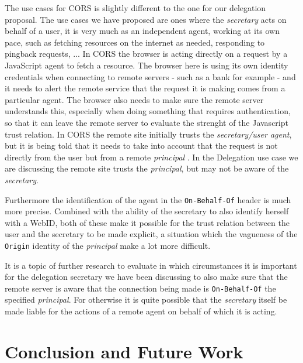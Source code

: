 \documentclass[a4paper]{llncs}
\begin{document}
The use cases for CORS is slightly different to the one for our delegation proposal. 
The use cases we have proposed are ones where the \textit{secretary} acts on behalf of a user, it is very much as an independent agent, working at its own pace, such as fetching resources on the internet as needed, responding to pingback requests, ... 
In CORS the browser is acting directly on a request by a JavaScript agent to fetch a resource.
The browser here is using its own identity credentials when connecting to remote servers - such as a bank for example - and it needs to alert the remote service that the request it is making comes from a particular agent.
The browser also needs to make sure the remote server understands this, especially when doing something that requires authentication, so that it can leave the remote server to evaluate the strenght of the Javascript trust relation.
In CORS the remote site initially trusts the \textit{secretary/user agent}, but it is being told that it needs to take into account that the request is not directly from the user but from a remote \textit{principal} .
In the Delegation use case we are discussing the remote site trusts the \textit{principal}, but may not be aware of the \textit{secretary}.

Furthermore the identification of the agent in the \lstinline|On-Behalf-Of| header is much more precise. Combined with the ability of the secretary to also identify herself with a WebID, both of these make it possible for the trust relation between the user and the secretary to be made explicit, a situation which the vagueness of the \lstinline|Origin| identity of the \textit{principal} make a lot more difficult. 

It is a topic of further research to evaluate in which circumstances it is important for the delegation secretary we have been discussing to also make sure that the remote server is aware that the connection being made is \lstinline|On-Behalf-Of| the specified \textit{principal}. For otherwise it is quite possible that the \textit{secretary} itself be made liable for the actions of a remote agent on behalf of which it is acting.

\section{Conclusion and Future Work}\label{sec:conclusion}
\end{document}
